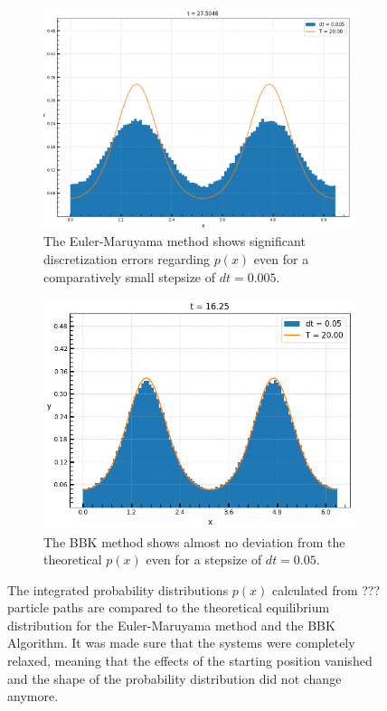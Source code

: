 	\begin{figure}[htp]
		\begin{subfigure}{0.5\textwidth}
			\centering
			\includegraphics[width=0.8\linewidth]{graphics/Distribution-Euler-0.005.png}
			\caption{The Euler-Maruyama method shows significant discretization errors regarding $p(x)$ even for a comparatively small stepsize of $dt =	0.005$.}
		\end{subfigure}
		\begin{subfigure}{0.5\textwidth}
			\centering
			\includegraphics[width=0.8\linewidth]{graphics/Distribution-BBK-0.05.png}
			\caption{The BBK method shows almost no deviation from the theoretical $p(x)$ even for a stepsize of $dt =	0.05$.}
		\end{subfigure}
		\caption{The integrated probability distributions $p(x)$ calculated from ??? particle paths are compared to the theoretical equilibrium distribution for the Euler-Maruyama method and the BBK Algorithm. It was made sure that the systems were completely relaxed, meaning that the effects of the starting position vanished and the shape of the probability distribution did not change anymore.}
		\label{Fig::Cos-Prob-Dist}
	\end{figure}
		
